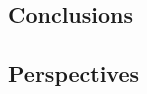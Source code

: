 \documentclass[xcolor=x11names, compress, 11pt]{beamer}
\begin{document}
\subsection{Conclusions}
\begin{frame}[c]
    \vfill
    \vfill
\end{frame}


\subsection{Perspectives}
\begin{frame}[c]
    \vfill
    \vfill
\end{frame}































\end{document}
